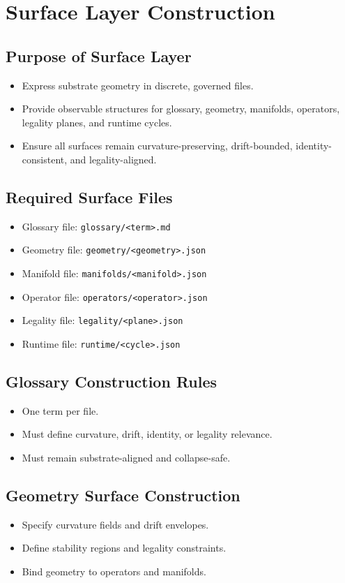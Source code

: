 \section{Surface Layer Construction}

\subsection{Purpose of Surface Layer}
\begin{itemize}
    \item Express substrate geometry in discrete, governed files.
    \item Provide observable structures for glossary, geometry, manifolds, operators, legality planes, and runtime cycles.
    \item Ensure all surfaces remain curvature-preserving, drift-bounded, identity-consistent, and legality-aligned.
\end{itemize}

\subsection{Required Surface Files}
\begin{itemize}
    \item Glossary file: \texttt{glossary/<term>.md}
    \item Geometry file: \texttt{geometry/<geometry>.json}
    \item Manifold file: \texttt{manifolds/<manifold>.json}
    \item Operator file: \texttt{operators/<operator>.json}
    \item Legality file: \texttt{legality/<plane>.json}
    \item Runtime file: \texttt{runtime/<cycle>.json}
\end{itemize}

\subsection{Glossary Construction Rules}
\begin{itemize}
    \item One term per file.
    \item Must define curvature, drift, identity, or legality relevance.
    \item Must remain substrate-aligned and collapse-safe.
\end{itemize}

\subsection{Geometry Surface Construction}
\begin{itemize}
    \item Specify curvature fields and drift envelopes.
    \item Define stability regions and legality constraints.
    \item Bind geometry to operators and manifolds.
\end{itemize}

